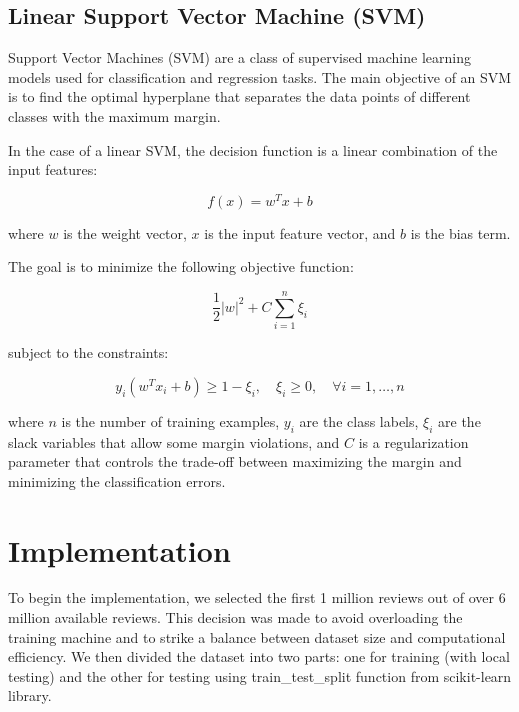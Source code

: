 \documentclass{article}
\begin{document}
\subsection{Linear Support Vector Machine (SVM)}

Support Vector Machines (SVM) are a class of supervised machine learning models used for classification and regression tasks. The main objective of an SVM is to find the optimal hyperplane that separates the data points of different classes with the maximum margin.

In the case of a linear SVM, the decision function is a linear combination of the input features:

\begin{equation}
f(x) = w^T x + b
\end{equation}

where $w$ is the weight vector, $x$ is the input feature vector, and $b$ is the bias term.

The goal is to minimize the following objective function:

\begin{equation}
\frac{1}{2} |w|^2 + C \sum_{i=1}^{n} \xi_i
\end{equation}

subject to the constraints:

\begin{equation}
y_i (w^T x_i + b) \geq 1 - \xi_i, \quad \xi_i \geq 0, \quad \forall i = 1, \dots, n
\end{equation}

where $n$ is the number of training examples, $y_i$ are the class labels, $\xi_i$ are the slack variables that allow some margin violations, and $C$ is a regularization parameter that controls the trade-off between maximizing the margin and minimizing the classification errors.


\section{Implementation}

To begin the implementation, we selected the first 1 million reviews out of over 6 million available reviews. This decision was made to avoid overloading the training machine and to strike a balance between dataset size and computational efficiency. We then divided the dataset into two parts: one for training (with local testing) and the other for testing using train\_test\_split function from scikit-learn library.
\end{document}
